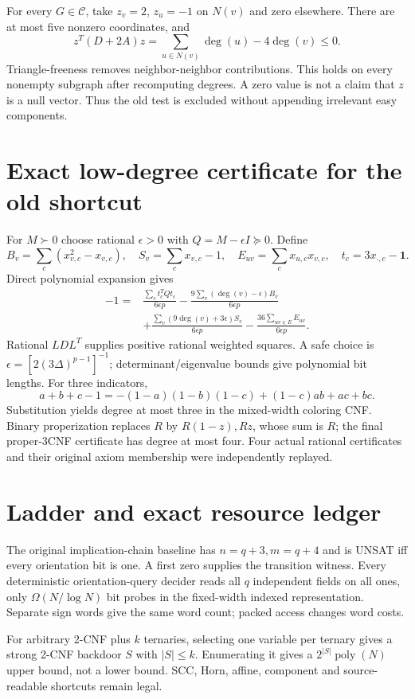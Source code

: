 \documentclass[11pt]{article}
\begin{document}
For every $G\in\mathcal C$, take $z_v=2$, $z_u=-1$ on $N(v)$ and zero elsewhere. There are at most five nonzero coordinates, and
\[
z^T(D+2A)z=\sum_{u\in N(v)}\deg(u)-4\deg(v)\le0.
\]
Triangle-freeness removes neighbor-neighbor contributions. This holds on every nonempty subgraph after recomputing degrees. A zero value is not a claim that $z$ is a null vector. Thus the old test is excluded without appending irrelevant easy components.

\section{Exact low-degree certificate for the old shortcut}
For $M\succ0$ choose rational $\epsilon>0$ with $Q=M-\epsilon I\succeq0$. Define
\[
B_v=\sum_c(x_{v,c}^2-x_{v,c}),\quad S_v=\sum_cx_{v,c}-1,
\quad E_{uv}=\sum_cx_{u,c}x_{v,c},\quad t_c=3x_{\cdot,c}-\mathbf1.
\]
Direct polynomial expansion gives
\[
\begin{aligned}
-1={}&\frac{\sum_c t_c^TQt_c}{6\epsilon p}
-\frac{9\sum_v(\deg(v)-\epsilon)B_v}{6\epsilon p}\\
&+\frac{\sum_v(9\deg(v)+3\epsilon)S_v}{6\epsilon p}
-\frac{36\sum_{uv\in E}E_{uv}}{6\epsilon p}.
\end{aligned}
\]
Rational $LDL^T$ supplies positive rational weighted squares. A safe choice is $\epsilon=[2(3\Delta)^{p-1}]^{-1}$; determinant/eigenvalue bounds give polynomial bit lengths. For three indicators,
\[
a+b+c-1=-(1-a)(1-b)(1-c)+(1-c)ab+ac+bc.
\]
Substitution yields degree at most three in the mixed-width coloring CNF. Binary properization replaces $R$ by $R(1-z),Rz$, whose sum is $R$; the final proper-3CNF certificate has degree at most four. Four actual rational certificates and their original axiom membership were independently replayed.

\section{Ladder and exact resource ledger}
The original implication-chain baseline has $n=q+3,m=q+4$ and is UNSAT iff every orientation bit is one. A first zero supplies the transition witness. Every deterministic orientation-query decider reads all $q$ independent fields on all ones, only $\Omega(N/\log N)$ bit probes in the fixed-width indexed representation. Separate sign words give the same word count; packed access changes word costs.

For arbitrary 2-CNF plus $k$ ternaries, selecting one variable per ternary gives a strong 2-CNF backdoor $S$ with $|S|\le k$. Enumerating it gives a $2^{|S|}\operatorname{poly}(N)$ upper bound, not a lower bound. SCC, Horn, affine, component and source-readable shortcuts remain legal.
\end{document}
